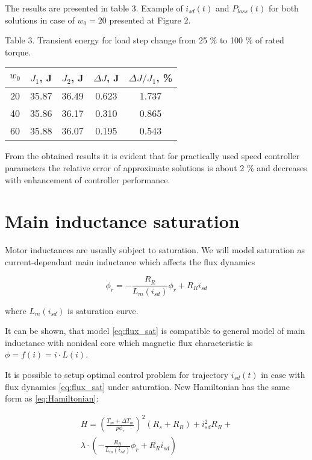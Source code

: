 \documentclass[journal]{IEEEtran}
\begin{document}
The results are presented in table 3. Example of $i_{sd}(t)$ and $P_{loss}(t)$ for both solutions in case of $w_0 = 20$ presented at Figure 2.

\begin{center}
Table 3.
Transient energy for load step change from 25 \% to 100 \% of rated torque.

\begin{tabular}{ | c | c | c | c | c | }
\hline 
  $w_0$ & $J_1$, J & $J_2$, J & $\Delta J$, J & $\Delta J/J_1$, \% \\
\hline 
20 &  35.87 &  36.49  &  0.623  &  1.737 \\
40 &  35.86 &  36.17  &  0.310  &  0.865 \\
60 &  35.88 &  36.07  &  0.195  &  0.543 \\
\hline 
\end{tabular}

\end{center}

From the obtained results it is evident that for practically used speed controller parameters the relative error of approximate solutions is about 2 \% and decreases with enhancement of controller performance.

\section{Main inductance saturation}

Motor inductances are usually subject to saturation. We will model saturation as current-dependant main inductance which affects the flux dynamics

\begin{equation}\label{eq:flux_sat}
\dot \phi_r = -\frac{R_R}{L_m(i_{sd})} \phi_r + R_R i_{sd}
\end{equation}

where $L_m(i_{sd})$ is saturation curve. 

It can be shown, that model \eqref{eq:flux_sat} is compatible to general model of main inductance with nonideal core \cite{10} which magnetic flux characteristic is $\phi = f(i) = i \cdot L(i)$.

It is possible to setup optimal control problem for trajectory $i_{sd}(t)$ in case with flux dynamics \eqref{eq:flux_sat} under saturation.
New Hamiltonian has the same form as \eqref{eq:Hamiltonian}:

\begin{equation}\label{eq:Hamiltonian_sat}
\begin{gathered}
H = \left ( \frac{T_m+\Delta T_m}{p \phi_r} \right )^2 (R_s + R_R) + i_{sd}^2 R_R + \\
 \lambda \cdot \left ( -\frac{R_R}{L_m(i_{sd})} \phi_r + R_R i_{sd} \right )
\end{gathered} 
\end{equation}
\end{document}
